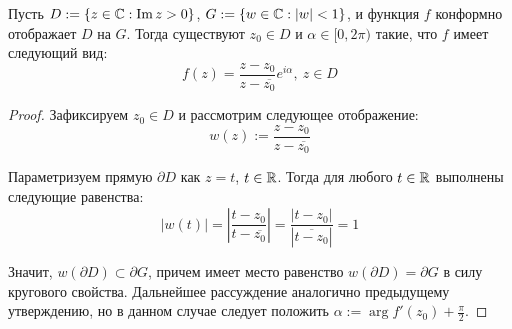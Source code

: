 \begin{proposition}
	Пусть $D := \{z \in \mathbb{C}: \operatorname{Im}{z} > 0\}$, $G := \{w \in \mathbb{C}: |w| < 1\}$, и функция $f$ конформно отображает $D$ на $G$. Тогда существуют $z_0 \in D$ и $\alpha \in [0, 2\pi)$ такие, что $f$ имеет следующий вид:
	\[f(z) = \frac{z - z_0}{z - \overline{z_0}}e^{i\alpha},~z \in D\]
\end{proposition}

\begin{proof}
	Зафиксируем $z_0 \in D$ и рассмотрим следующее отображение:
	\[w(z) := \frac{z - z_0}{z - \overline{z_0}}\]
	
	Параметризуем прямую $\partial D$ как $z = t$, $t \in \mathbb{R}$. Тогда для любого $t \in \mathbb{R}$ выполнены следующие равенства:
	\[\left|w\left(t\right)\right| = \left|\frac{t - z_0}{t - \overline{z_0}}\right| = \frac{|t - z_0|}{\left|\overline{t - z_0}\right|} =  1\]
	
	Значит, $w(\partial D) \subset \partial G$, причем имеет место равенство  $w(\partial D) = \partial G$ в силу кругового свойства. Дальнейшее рассуждение аналогично предыдущему утверждению, но в данном случае следует положить $\alpha := \arg{f'(z_0)} + \frac\pi 2$.
\end{proof}